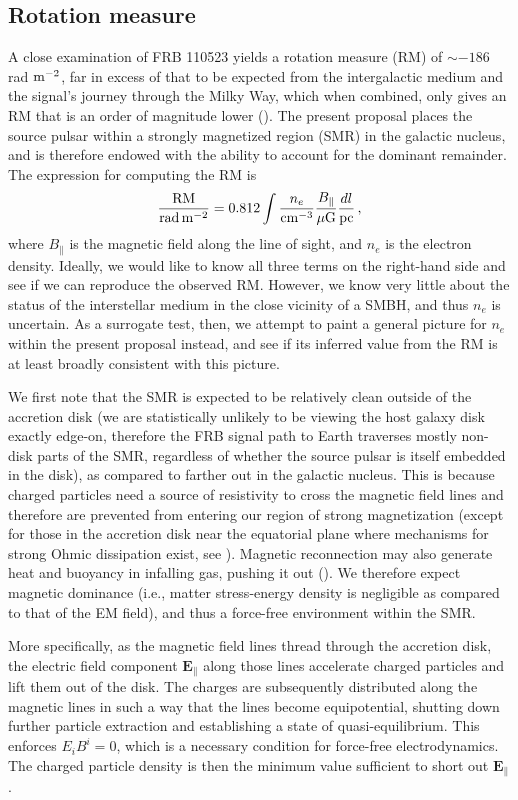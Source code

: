 \documentclass{aa}
\newcommand{\bea}{\begin{eqnarray}}
\newcommand{\eea}{\end{eqnarray}}
\begin{document}
\subsection{Rotation measure} 
A close examination of FRB 110523 yields a rotation measure (RM) of $\sim -186$ rad $\rm m^{-2}$, far in excess of that to be expected from the intergalactic medium and the signal's journey through the Milky Way, which when combined, only gives an RM that is an order of magnitude lower (\cite{2015Natur.528..523M}). The present proposal places the source pulsar within a strongly magnetized region (SMR) in the galactic nucleus, and is therefore endowed with the ability to account for the dominant remainder. The expression for computing the RM is 
\bea
\frac{\rm RM}{\rm rad\,  m^{-2}} = 0.812  \int \frac{n_e}{\rm cm^{-3}}\frac{B_{\parallel}}{\rm \mu G}\frac{dl}{\rm pc}\,,
\eea
where $B_{\parallel}$ is the magnetic field along the line of sight, and $n_e$ is the electron density. Ideally, we would like to know all three terms on the right-hand side and see if we can reproduce the observed RM. However, we know very little about the status of the interstellar medium in the close vicinity of a SMBH, and thus $n_e$ is uncertain. As a surrogate test, then, we attempt to paint a general picture for $n_e$ within the present proposal instead, and see if its inferred value from the RM is at least broadly consistent with this picture. 

We first note that the SMR is expected to be relatively clean outside of the accretion disk (we are statistically unlikely to be viewing the host galaxy disk exactly edge-on, therefore
the FRB signal path to Earth traverses mostly non-disk parts of the SMR, regardless of whether the source pulsar is itself embedded in the disk),
as compared to farther out in the galactic nucleus. This is because charged particles need a source of resistivity to cross the magnetic field lines and therefore are prevented from entering our region of strong magnetization (except for those in the accretion disk near the equatorial plane where mechanisms for strong Ohmic dissipation exist, see \cite{1977MNRAS.179..433B}). Magnetic reconnection may also generate heat and buoyancy in infalling gas, pushing it out (\cite{2002ApJ...566..137I}). 
We therefore expect magnetic dominance (i.e., matter stress-energy density is negligible as compared to that of the EM field), and thus a force-free environment within the SMR. 

More specifically, as the magnetic field lines thread through the accretion disk, the electric field component $\bm{E}_{\parallel}$ along those lines accelerate charged particles and lift them out of the disk. The charges are subsequently distributed along the magnetic lines in such a way that the lines become equipotential, shutting down further particle extraction and establishing a state of quasi-equilibrium. This enforces $E_i B^i =0$, which is a necessary condition for force-free electrodynamics. The charged particle density is then the minimum value sufficient to short out $\bm{E}_{\parallel}$. 
\end{document}
